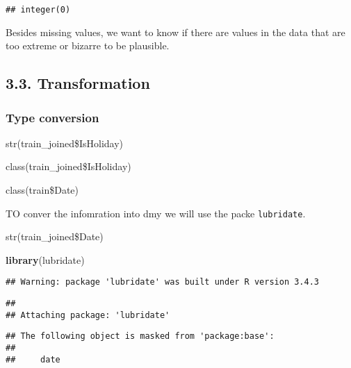 \documentclass[11pt,]{article}
\newenvironment{Shaded}{\begin{snugshade}}{\end{snugshade}}
\newcommand{\KeywordTok}[1]{\textcolor[rgb]{0.13,0.29,0.53}{\textbf{{#1}}}}
\newcommand{\StringTok}[1]{\textcolor[rgb]{0.31,0.60,0.02}{{#1}}}
\newcommand{\CommentTok}[1]{\textcolor[rgb]{0.56,0.35,0.01}{\textit{{#1}}}}
\newcommand{\NormalTok}[1]{{#1}}
\begin{document}
\begin{verbatim}
## integer(0)
\end{verbatim}

Besides missing values, we want to know if there are values in the data
that are too extreme or bizarre to be plausible.

\subsection{3.3. Transformation}\label{transformation}

\subsubsection{Type conversion}\label{type-conversion}

str(train\_joined\$IsHoliday)

\begin{Shaded}
\end{Shaded}

class(train\_joined\$IsHoliday)

class(train\$Date)

TO conver the infomration into dmy we will use the packe
\texttt{lubridate}.

str(train\_joined\$Date)

\begin{Shaded}
\begin{Highlighting}[]
\KeywordTok{library}\NormalTok{(lubridate)}
\end{Highlighting}
\end{Shaded}

\begin{verbatim}
## Warning: package 'lubridate' was built under R version 3.4.3
\end{verbatim}

\begin{verbatim}
## 
## Attaching package: 'lubridate'
\end{verbatim}

\begin{verbatim}
## The following object is masked from 'package:base':
## 
##     date
\end{verbatim}
\end{document}
